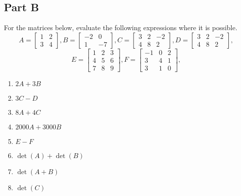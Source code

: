 \documentclass[12pt,a4paper]{article}
\begin{document}
\subsection*{Part B}
For the matrices below, evaluate the following expressions where it is possible.
\begin{equation*}
A=\left[ \begin{array}{cc} 1  & 2 \\ 3 & 4 \end{array}\right],
B=\left[ \begin{array}{cc} -2  & 0 \\ 1 & -7 \end{array}\right],
C=\left[ \begin{array}{ccc} 3  & 2 & -2 \\ 4 & 8 & 2 \end{array}\right],
D=\left[ \begin{array}{ccc} 3  & 2 & -2 \\ 4 & 8 & 2 \end{array}\right],
\end{equation*}
\begin{equation*}
E=\left[ \begin{array}{ccc} 1  & 2 & 3 \\ 4 & 5 & 6 \\ 7 & 8 & 9 \end{array}\right],
F=\left[ \begin{array}{ccc} -1  & 0 & 2 \\ 3 & 4 & 1 \\  3 & 1 & 0 \end{array}\right],     
\end{equation*}
\begin{multicols}{2}
	\begin{enumerate}
		\item $2A+3B$
		\item $3C-D$
		\item $8A+4C$
		\item $2000A+3000B$
		\item $E-F$
		\item $\det(A)+\det(B)$
		\item $\det(A+B)$
		\item $\det(C)$
	\end{enumerate}
\end{multicols}
\end{document}
